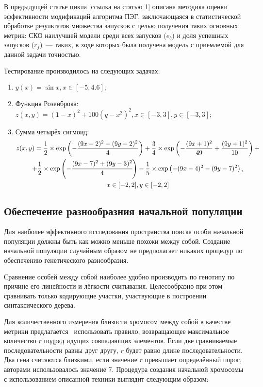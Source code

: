 В предыдущей статье цикла [ссылка на статью 1] описана методика оценки эффективности модификаций алгоритма ПЭГ, заключающаяся в статистической обработке результатов множества запусков с целью получения таких основных метрик: СКО наилучшей модели среди всех запусков ($e_{b}$) и доля успешных запусков ($r_{f}$)~--- таких, в ходе которых была получена модель с приемлемой для данной задачи точностью.

Тестирование производилось на следующих задачах:
\begin{enumerate}
  \item $y(x) = \sin x, x \in [-5, 4.6]$;
  \item Функция Розенброка: $z(x, y) = {(1 - x)}^2 + 100 {(y - x^2)}^2, x \in [-3, 3], y \in [-3, 3]$;
  \item Сумма четырёх сигмоид:
    \begin{multline}
      z(x, y) = \frac{1}{2} \times \exp\left(-\frac{(9x-2)^2 - (9y-2)^2}{4}\right) + \frac{3}{4} \times \exp\left(-\frac{(9x+1)^2}{49} + \frac{(9y+1)^2}{10}\right) + \\
      + \frac{1}{2} \times \exp\left(-\cfrac{(9x-7)^2 + (9y-3)^2}{4}\right) -\frac{1}{5} \times \exp\left(-(9x-4)^2 - (9y-7)^2\right), \\
      x \in [-2, 2], y \in [-2, 2]
    \end{multline}
\end{enumerate}






\subsection{Обеспечение разнообразния начальной популяции}

Для наиболее эффективного исследования пространства поиска особи начальной популяции должны быть как можно меньше похожи между собой. Создание начальной популяции случайным образом не предполагает никаких процедур по обеспечению генетического разнообразия.

Сравнение особей между собой наиболее удобно производить по генотипу по причине его линейности и лёгкости считывания. Целесообразно при этом сравнивать только кодирующие участки, участвующие в построении синтаксического дерева.

Для количественного измерения близости хромосом между собой в качестве метрики предлагается~\cite{Duan:2007:SID:1304604.1305918} использовать правило, возвращающее максимальное количество $r$ подряд идущих совпадающих элементов. Если две сравниваемые последовательности равны друг другу, $r$ будет равно длине последовательности. Два гена считаются близкими, если значение $r$ превышает определённый порог, авторами использовалось значение 7.
Процедура создания начальной хромосомы с использованием описанной техники выглядит следующим образом:

